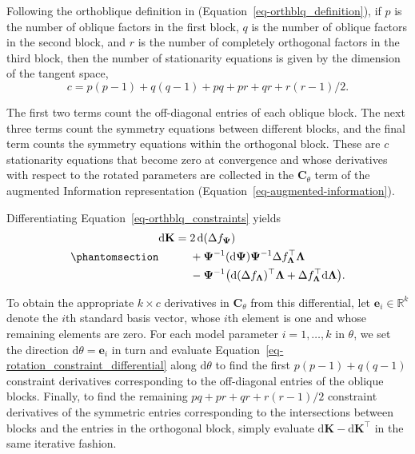 \documentclass[
  12pt,
  letterpaper,
  article]{scrartcl}
\begin{document}
Following the orthoblique definition in
(Equation~\ref{eq-orthblq_definition}), if \(p\) is the number of
oblique factors in the first block, \(q\) is the number of oblique
factors in the second block, and \(r\) is the number of completely
orthogonal factors in the third block, then the number of stationarity
equations is given by the dimension of the tangent space, \[
c = p(p-1) + q(q-1) + pq + pr + qr + r(r-1)/2.
\]

The first two terms count the off-diagonal entries of each oblique
block. The next three terms count the symmetry equations between
different blocks, and the final term counts the symmetry equations
within the orthogonal block. These are \(c\) stationarity equations that
become zero at convergence and whose derivatives with respect to the
rotated parameters are collected in the \(\mathbf{C}_\theta\) term of
the augmented Information representation
(Equation~\ref{eq-augmented-information}).

Differentiating Equation~\ref{eq-orthblq_constraints} yields
\begin{equation}\protect\phantomsection\label{eq-rotation_constraint_differential}{
\begin{aligned}
\mathrm{d}\mathbf{K}
={}&2\,\mathrm{d}(\Delta f_{\mathbf{\Psi}})\\
&+\mathbf{\Psi}^{-1}(\mathrm{d}\mathbf{\Psi})\mathbf{\Psi}^{-1}
  \Delta f_{\mathbf{\Lambda}}^\top\mathbf{\Lambda}\\
&-\mathbf{\Psi}^{-1}
  \big(
    \mathrm{d}(\Delta f_{\mathbf{\Lambda}})^\top\mathbf{\Lambda}
    +\Delta f_{\mathbf{\Lambda}}^\top\mathrm{d}\mathbf{\Lambda}
  \big).
\end{aligned}
}\end{equation}

To obtain the appropriate \(k \times c\) derivatives in
\(\mathbf{C}_\theta\) from this differential, let
\(\mathbf{e}_i\in\mathbb{R}^k\) denote the \(i\)th standard basis
vector, whose \(i\)th element is one and whose remaining elements are
zero. For each model parameter \(i=1,\ldots,k\) in \(\theta\), we set
the direction \(\mathrm{d}\theta=\mathbf{e}_i\) in turn and evaluate
Equation~\ref{eq-rotation_constraint_differential} along
\(\mathrm{d}\theta\) to find the first \(p(p-1) + q(q-1)\) constraint
derivatives corresponding to the off-diagonal entries of the oblique
blocks. Finally, to find the remaining \(pq + pr + qr + r(r-1)/2\)
constraint derivatives of the symmetric entries corresponding to the
intersections between blocks and the entries in the orthogonal block,
simply evaluate \(\mathrm{d}\mathbf{K}-\mathrm{d}\mathbf{K}^\top\) in
the same iterative fashion.
\end{document}

